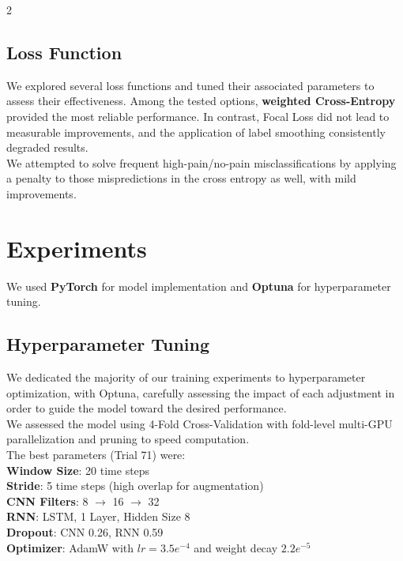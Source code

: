 \documentclass[11pt]{article}
\begin{document}
\begin{multicols}{2}
        \subsection{Loss Function}
  We explored several loss functions and tuned their associated parameters to assess their effectiveness. Among the tested options, \textbf{weighted Cross-Entropy} provided the most reliable performance. In contrast, Focal Loss did not lead to measurable improvements, and the application of label smoothing consistently degraded results.\\ We attempted to solve frequent high-pain/no-pain misclassifications by applying a penalty to those mispredictions in the cross entropy as well, with mild improvements. %

   
        
        
        \section{Experiments}
        We used \textbf{PyTorch} for model implementation and \textbf{Optuna} for hyperparameter tuning.
        
        \subsection{Hyperparameter Tuning}
       We dedicated the majority of our training experiments to hyperparameter optimization, with Optuna, carefully assessing the impact of each adjustment in order to guide the model toward the desired performance.\\
        We assessed the model using 4-Fold Cross-Validation with fold-level multi-GPU parallelization and pruning to speed computation. \\The best parameters (Trial 71) were:\\
        \textbf{Window Size}: 20 time steps\\
        \textbf{Stride}: 5 time steps (high overlap for augmentation)\\
        \textbf{CNN Filters}: 8 $\to$ 16 $\to$ 32\\
        \textbf{RNN}: LSTM, 1 Layer, Hidden Size 8\\
        \textbf{Dropout}: CNN 0.26, RNN 0.59\\
        \textbf{Optimizer}: AdamW with $lr=3.5e^{-4}$ and weight decay $2.2e^{-5}$\\
    

\end{multicols}
\end{document}
